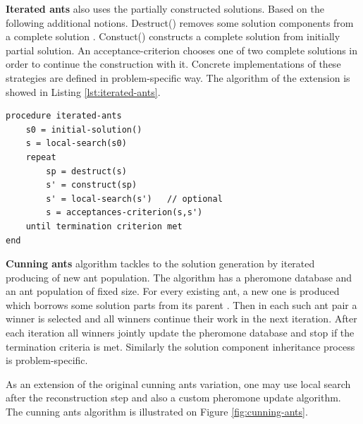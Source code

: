\documentclass[11pt,a4paper,oneside]{book}
\begin{document}
\textbf{Iterated ants} also uses the partially constructed solutions. Based on the following additional notions. Destruct() removes some solution components from a complete solution \cite{10.1007/11839088_16}. Constuct() constructs a complete solution from initially partial solution. An acceptance-criterion chooses one of two complete solutions in order to continue the construction with it. Concrete implementations of these strategies are defined in problem-specific way. The algorithm of the extension is showed in Listing \ref{lst:iterated-ants}.

\begin{minipage}[c, breaklines=true]{0.95\textwidth}
\begin{lstlisting}[caption={General iterated ants pseudo-code}, label={lst:iterated-ants}]
procedure iterated-ants
	s0 = initial-solution()
	s = local-search(s0)
	repeat
		sp = destruct(s)
		s' = construct(sp)
		s' = local-search(s')   // optional
		s = acceptances-criterion(s,s')
	until termination criterion met
end
\end{lstlisting}
\end{minipage}

\textbf{Cunning ants} algorithm tackles to the solution generation by iterated producing of new ant population. The algorithm has a pheromone database and an ant population of fixed size. For every existing ant, a new one is produced which borrows some solution parts from its parent \cite{Tsutsui2007}. Then in each such ant pair a winner is selected and all winners continue their work in the next iteration. After each iteration all winners jointly update the pheromone database and stop if the termination criteria is met. Similarly the solution component inheritance process is problem-specific.

As an extension of the original cunning ants variation, one may use local search after the reconstruction step and also a custom pheromone update algorithm. The cunning ants algorithm is illustrated on Figure \ref{fig:cunning-ants}.
\end{document}

